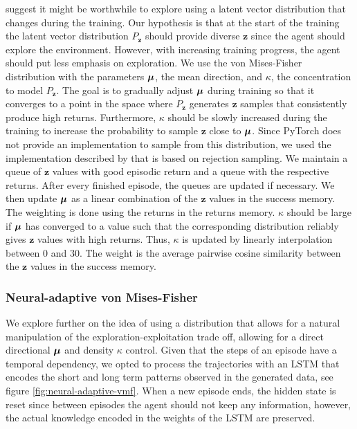\documentclass[10pt]{article} %
\begin{document}
\cite{rle-paper} suggest it might be worthwhile to explore using a latent vector distribution that changes during the training. Our hypothesis is that at the start of the training the latent vector distribution $P_{\textbf{z}}$ should provide diverse $\textbf{z}$ since the agent should explore the environment. However, with increasing training progress, the agent should put less emphasis on exploration. We use the von Mises-Fisher distribution with the parameters ${\bm{\mu}}$, the mean direction, and $\kappa$, the concentration to model $P_{\textbf{z}}$. The goal is to gradually adjust ${\bm{\mu}}$ during training so that it converges to a point in the space where $P_{\textbf{z}}$ generates $\mathbf{z}$ samples that consistently produce high returns. Furthermore, $\kappa$ should be slowly increased during the training to increase the probability to sample $\mathbf{z}$ close to ${\bm{\mu}}$. Since PyTorch does not provide an implementation to sample from this distribution, we used the implementation described by \cite{von-mises-fisher-paper} that is based on rejection sampling. We maintain a queue of $\textbf{z}$ values with good episodic return and a queue with the respective returns. After every finished episode, the queues are updated if necessary. We then update ${\bm{\mu}}$ as a linear combination of the $\textbf{z}$ values in the success memory. The weighting is done using the returns in the returns memory. $\kappa$ should be large if ${\bm{\mu}}$ has converged to a value such that the corresponding distribution reliably gives $\textbf{z}$ values with high returns. Thus, $\kappa$ is updated by linearly interpolation between $0$ and $30$. The weight is the average pairwise cosine similarity between the $\textbf{z}$ values in the success memory.

\vspace{-1pt}
\subsubsection{Neural-adaptive von Mises-Fisher}

We explore further on the idea of using a distribution that allows for a natural manipulation of the exploration-exploitation trade off, allowing for a direct directional ${\bm{\mu}}$ and density $\kappa$ control. Given that the steps of an episode have a temporal dependency, we opted to process the trajectories with an LSTM that encodes the short and long term patterns observed in the generated data, see figure \ref{fig:neural-adaptive-vmf}. When a new episode ends, the hidden state is reset since between episodes the agent should not keep any information, however, the actual knowledge encoded in the weights of the LSTM are preserved. 
\end{document}

